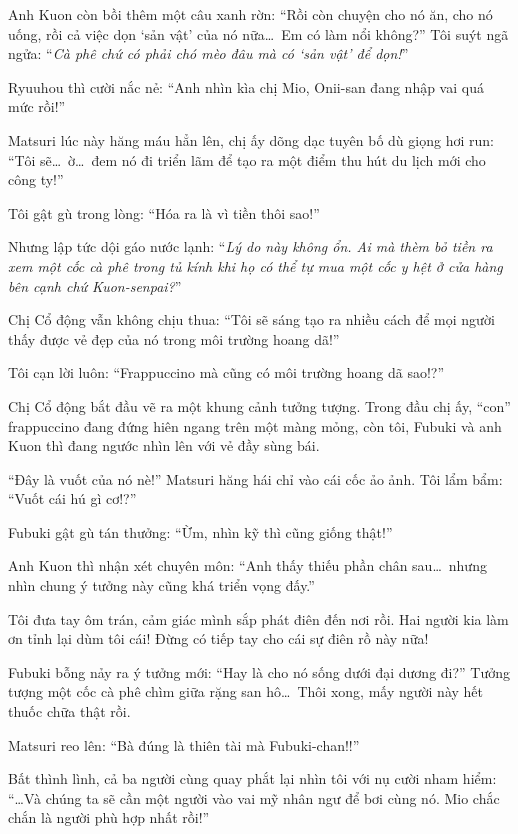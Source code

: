 \documentclass[../main.tex]{subfiles}
\begin{document}
Anh Kuon còn bồi thêm một câu xanh rờn: ``Rồi còn chuyện cho nó ăn, cho nó uống, rồi cả việc dọn `sản vật' của nó nữa\dots\ Em có làm nổi không?''
Tôi suýt ngã ngửa: ``\textit{Cà phê chứ có phải chó mèo đâu mà có `sản vật' để dọn!}''

Ryuuhou thì cười nắc nẻ: ``Anh nhìn kìa chị Mio, Onii-san đang nhập vai quá mức rồi!''

Matsuri lúc này hăng máu hẳn lên, chị ấy dõng dạc tuyên bố dù giọng hơi run: ``Tôi sẽ\dots\ ờ\dots\ đem nó đi triển lãm để tạo ra một điểm thu hút du lịch mới cho công ty!''

Tôi gật gù trong lòng: ``Hóa ra là vì tiền thôi sao!''

Nhưng lập tức dội gáo nước lạnh: ``\textit{Lý do này không ổn. Ai mà thèm bỏ tiền ra xem một cốc cà phê trong tủ kính khi họ có thể tự mua một cốc y hệt ở cửa hàng bên cạnh chứ Kuon-senpai?}''

Chị Cổ động vẫn không chịu thua: ``Tôi sẽ sáng tạo ra nhiều cách để mọi người thấy được vẻ đẹp của nó trong môi trường hoang dã!''

Tôi cạn lời luôn: ``Frappuccino mà cũng có môi trường hoang dã sao!?''


Chị Cổ động bắt đầu vẽ ra một khung cảnh tưởng tượng. Trong đầu chị ấy, ``con'' frappuccino đang đứng hiên ngang trên một màng mỏng, còn tôi, Fubuki và anh Kuon thì đang ngước nhìn lên với vẻ đầy sùng bái.

``Đây là vuốt của nó nè!'' Matsuri hăng hái chỉ vào cái cốc ảo ảnh.
Tôi lẩm bẩm: ``Vuốt cái hú gì cơ!?''

Fubuki gật gù tán thưởng: ``Ừm, nhìn kỹ thì cũng giống thật!''

Anh Kuon thì nhận xét chuyên môn: ``Anh thấy thiếu phần chân sau\dots\ nhưng nhìn chung ý tưởng này cũng khá triển vọng đấy.''

Tôi đưa tay ôm trán, cảm giác mình sắp phát điên đến nơi rồi. Hai người kia làm ơn tỉnh lại dùm tôi cái! Đừng có tiếp tay cho cái sự điên rồ này nữa!


Fubuki bỗng nảy ra ý tưởng mới: ``Hay là cho nó sống dưới đại dương đi?'' Tưởng tượng một cốc cà phê chìm giữa rặng san hô\dots\ Thôi xong, mấy người này hết thuốc chữa thật rồi.

Matsuri reo lên: ``Bà đúng là thiên tài mà Fubuki-chan!!''

Bất thình lình, cả ba người cùng quay phắt lại nhìn tôi với nụ cười nham hiểm: ``\dots Và chúng ta sẽ cần một người vào vai mỹ nhân ngư để bơi cùng nó. Mio chắc chắn là người phù hợp nhất rồi!''
\end{document}
